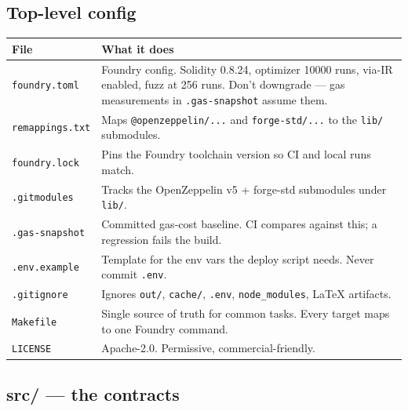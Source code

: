 \documentclass[11pt,a4paper]{article}
\begin{document}
\subsection{Top-level config}

\begin{center}
\begin{tabular}{p{3.6cm} p{12cm}}
\toprule
{\bfseries\color{axiprimary}File} & {\bfseries\color{axiprimary}What it does} \\
\midrule
\texttt{foundry.toml} & Foundry config. Solidity 0.8.24, optimizer 10000 runs, via-IR enabled, fuzz at 256 runs. Don't downgrade --- gas measurements in \texttt{.gas-snapshot} assume them. \\
\addlinespace[2pt]
\texttt{remappings.txt} & Maps \texttt{@openzeppelin/...} and \texttt{forge-std/...} to the \texttt{lib/} submodules. \\
\addlinespace[2pt]
\texttt{foundry.lock} & Pins the Foundry toolchain version so CI and local runs match. \\
\addlinespace[2pt]
\texttt{.gitmodules} & Tracks the OpenZeppelin v5 + forge-std submodules under \texttt{lib/}. \\
\addlinespace[2pt]
\texttt{.gas-snapshot} & Committed gas-cost baseline. CI compares against this; a regression fails the build. \\
\addlinespace[2pt]
\texttt{.env.example} & Template for the env vars the deploy script needs. Never commit \texttt{.env}. \\
\addlinespace[2pt]
\texttt{.gitignore} & Ignores \texttt{out/}, \texttt{cache/}, \texttt{.env}, \texttt{node\_modules}, LaTeX artifacts. \\
\addlinespace[2pt]
\texttt{Makefile} & Single source of truth for common tasks. Every target maps to one Foundry command. \\
\addlinespace[2pt]
\texttt{LICENSE} & Apache-2.0. Permissive, commercial-friendly. \\
\bottomrule
\end{tabular}
\end{center}

\subsection{src/ --- the contracts}
\end{document}
